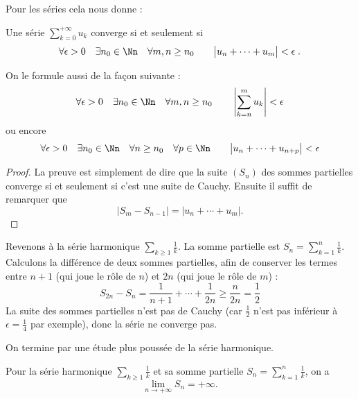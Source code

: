 \documentclass[class=report,crop=false]{standalone}
\begin{document}
Pour les séries cela nous donne : 
\begin{theoreme}
\label{th:cauchyserie}
Une série  $\displaystyle\sum_{k=0}^{+\infty} u_k$ converge si et seulement si  
$$\forall \epsilon>0 \quad \exists n_0\in\Nn \quad \forall m,n\ge n_0 \qquad \big|u_{n}+\cdots +u_m\big| < \epsilon \; .$$
\end{theoreme}
On le formule aussi de la façon suivante :
$$ \forall \epsilon>0 \quad \exists n_0\in\Nn \quad
\forall m,n \ge n_0 \qquad  \left| \sum_{k=n}^m u_k\right| <\epsilon$$
ou encore
$$ \forall \epsilon>0 \quad \exists n_0\in\Nn \quad
\forall n\ge n_0 \quad \forall p\in\Nn 
\qquad  \big|u_{n}+\cdots +u_{n+p}\big|<\epsilon$$



\begin{proof}
La preuve est simplement de dire que la suite $(S_n)$ des sommes partielles converge si
et seulement si c'est une suite de Cauchy. Ensuite il suffit de remarquer que 
$$\big|S_m-S_{n-1}\big|= \big|u_{n}+\cdots +u_m\big|.$$
\end{proof}



Revenons à la série harmonique $\sum_{k \ge 1} \frac{1}{k}$.
La somme partielle est $S_n = \sum_{k=1}^{n} \frac{1}{k}$.
Calculons la différence de deux sommes partielles, afin de conserver 
les termes entre $n+1$ (qui joue le rôle de $n$)
et $2n$ (qui joue le rôle de $m$) :
$$
S_{2n}-S_{n} = \frac{1}{n+1}+\cdots+\frac{1}{2n}\ge
\frac{n}{2n}=\frac{1}{2} 
$$
La suite des sommes partielles n'est pas de Cauchy (car $\frac12$ 
n'est pas inférieur à $\epsilon = \frac14$ par exemple), 
donc la série ne converge pas.

\bigskip


On termine par une étude plus poussée de la série harmonique.

\begin{proposition}
Pour la série harmonique $\displaystyle \sum_{k \ge 1} \frac{1}{k}$  
et sa somme partielle
$\displaystyle S_n = \sum_{k = 1}^n \frac{1}{k}$, on a 
$$\lim_{n\to+\infty} S_n=+\infty.$$
\end{proposition}
\end{document}
